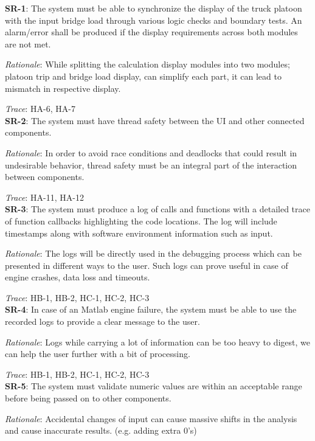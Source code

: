 \documentclass{article}
\begin{document}
\textbf{SR-1}:
The system must be able to synchronize the display of the truck platoon with the input bridge load through various logic checks and boundary tests. An alarm/error shall be produced if the display requirements across both modules are not met. 

\emph{Rationale}: While splitting the calculation display modules into two modules; platoon trip and bridge load display, can simplify each part, it can lead to mismatch in respective display.

\emph{Trace}: HA-6, HA-7\\

\textbf{SR-2}: 
The system must have thread safety between the UI and other connected components.

\emph{Rationale}: In order to avoid race conditions and deadlocks that could result in undesirable behavior,
thread safety must be an integral part of the interaction between components.

\emph{Trace}: HA-11, HA-12 \\

\textbf{SR-3}: 
The system must produce a log of calls and functions with a detailed trace of function callbacks highlighting the code locations. The log will include timestamps along with software environment information such as input.

\emph{Rationale}:
The logs will be directly used in the debugging process which can be presented in different ways to the user. Such logs can prove useful in case of engine crashes, data loss and timeouts.

\emph{Trace}: HB-1, HB-2, HC-1, HC-2, HC-3\\

\textbf{SR-4}:
In case of an Matlab engine failure, the system must be able to use the recorded logs to provide a clear message to the user.

\emph{Rationale}: Logs while carrying a lot of information can be too heavy to digest, we can help the user further with a bit of processing.

\emph{Trace}: HB-1, HB-2, HC-1, HC-2, HC-3\\

\textbf{SR-5}:
The system must validate numeric values are within an acceptable range before being passed on to other components.

\emph{Rationale}: Accidental changes of input can cause massive shifts in the analysis and cause inaccurate results. (e.g. adding extra 0’s)
\end{document}
